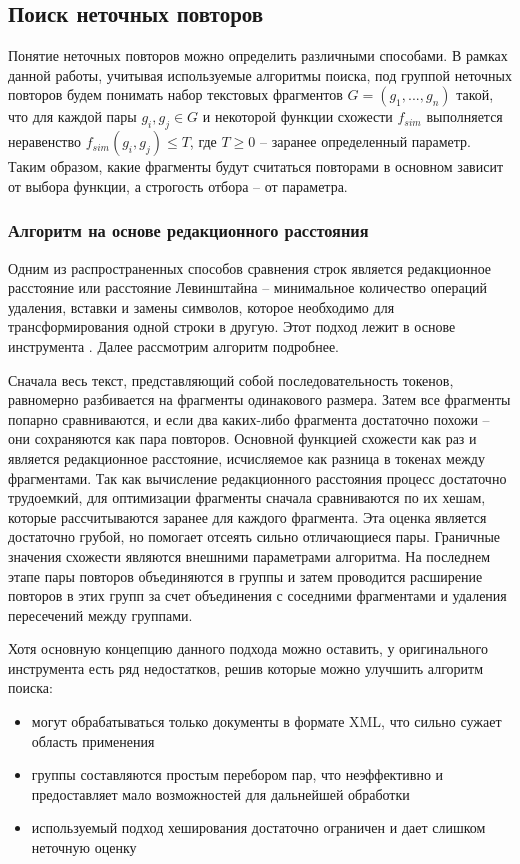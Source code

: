 \documentclass[14pt]{matmex-diploma-custom}
\begin{document}
\subsection{Поиск неточных повторов}

Понятие неточных повторов можно определить различными способами. В рамках данной работы, учитывая используемые алгоритмы поиска, под группой неточных повторов будем понимать набор текстовых фрагментов $G = (g_1,...,g_n)$ такой, что для каждой пары $g_i, g_j \in G$ и некоторой функции схожести $f_{sim}$ выполняется неравенство $f_{sim}(g_i, g_j) \le T$, где $T\ge0$ -- заранее определенный параметр. Таким образом, какие фрагменты будут считаться повторами в основном зависит от выбора функции, а строгость отбора -- от параметра.

\subsubsection{Алгоритм на основе редакционного расстояния}

Одним из распространенных способов сравнения строк является редакционное расстояние или расстояние Левинштайна -- минимальное количество операций удаления, вставки и замены символов, которое необходимо для трансформирования одной строки в другую. Этот подход лежит в основе инструмента \cite{bib:tool:FuzzySearch}. Далее рассмотрим алгоритм подробнее.

Сначала весь текст, представляющий собой последовательность токенов, равномерно разбивается на фрагменты одинакового размера. Затем все фрагменты попарно сравниваются, и если два каких-либо фрагмента достаточно похожи -- они сохраняются как пара повторов. Основной функцией схожести как раз и является редакционное расстояние, исчисляемое как разница в токенах между фрагментами. Так как вычисление редакционного расстояния процесс достаточно трудоемкий, для оптимизации фрагменты сначала сравниваются по их хешам, которые рассчитываются заранее для каждого фрагмента.  Эта оценка является достаточно грубой, но помогает отсеять сильно отличающиеся пары. Граничные значения схожести являются внешними параметрами алгоритма. На последнем этапе пары повторов объединяются в группы и затем проводится расширение повторов в этих групп за счет объединения с соседними фрагментами и удаления пересечений между группами.

Хотя основную концепцию данного подхода можно оставить, у оригинального инструмента есть ряд недостатков, решив которые можно улучшить алгоритм поиска:
\begin{itemize}
	\item могут обрабатываться только документы в формате XML, что сильно сужает область применения
	\item группы составляются простым перебором пар, что неэффективно и предоставляет мало возможностей для дальнейшей обработки
	\item используемый подход хеширования достаточно ограничен и дает слишком неточную оценку
\end{itemize}
\end{document}
